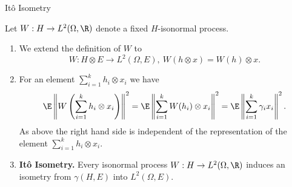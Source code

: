 %
%




\begin{frame}
    {It\^o Isometry}
    
    Let $W: H \to L^2(\Omega, \R)$ denote a fixed $H$-isonormal process.
    \begin{enumerate}
        \item We extend the definition of $W$ to
        \begin{equation*}
            W: H \otimes E \to L^2(\Omega, E), \ W(h \otimes x) = W(h) \otimes x.
        \end{equation*}
        \item For an element $\sum_{i=1}^{k} h_i \otimes x_i$ we have
            \begin{equation*}
                \E \left\| W\left(\sum_{i=1}^{k} h_i \otimes x_i \right) \right\|^2 = 
                \E \left\| \sum_{i=1}^{k} W(h_i) \otimes x_i  \right\|^2 = 
                \E \left\| \sum_{i=1}^{k} \gamma_i x_i  \right\|^2.
            \end{equation*}
            As above the right hand side is independent of the representation of the element
            $\sum_{i=1}^{k} h_i \otimes x_i$. 
        \item \textbf{It\^o Isometry.} Every isonormal process $W: H \to L^2(\Omega, \R)$
            induces an isometry from $\gamma(H,E)$ into $L^2(\Omega, E)$.
    \end{enumerate}
\end{frame}


